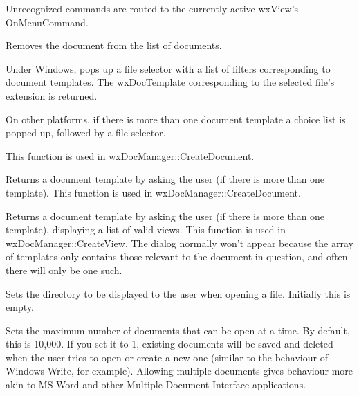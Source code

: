 Unrecognized commands are routed to the currently active wxView's OnMenuCommand.



Removes the document from the list of documents.



Under Windows, pops up a file selector with a list of filters corresponding to document templates.
The wxDocTemplate corresponding to the selected file's extension is returned.

On other platforms, if there is more than one document template a choice list is popped up,
followed by a file selector.

This function is used in wxDocManager::CreateDocument.



Returns a document template by asking the user (if there is more than one template).
This function is used in wxDocManager::CreateDocument.



Returns a document template by asking the user (if there is more than one template),
displaying a list of valid views. This function is used in wxDocManager::CreateView.
The dialog normally won't appear because the array of templates only contains
those relevant to the document in question, and often there will only be one such.

\label{wxdocmanagersetlastdirectory}


Sets the directory to be displayed to the user when opening a file. Initially this is empty.



Sets the maximum number of documents that can be open at a time. By default, this
is 10,000. If you set it to 1, existing documents will be saved and deleted
when the user tries to open or create a new one (similar to the behaviour
of Windows Write, for example). Allowing multiple documents gives behaviour
more akin to MS Word and other Multiple Document Interface applications.



